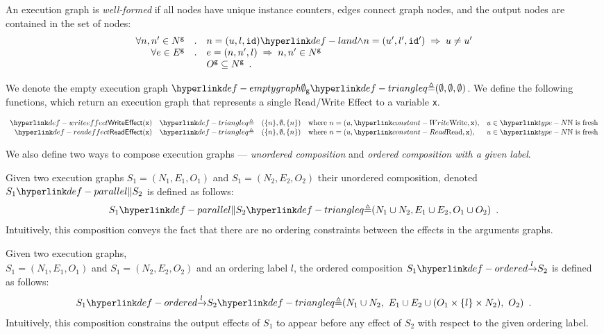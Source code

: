 An execution graph is \emph{well-formed} if all nodes have unique instance counters, edges connect graph nodes,
and the output nodes are contained in the set of nodes:
\[
  \begin{array}{rcl}
  \forall n, n' \in N^\xgraph &.& n=(u,l,\id) \land n=(u',l',\id') \;\Rightarrow\; u \neq u' \\
  \forall e \in E^\xgraph &.& e=(n, n', l) \;\Rightarrow\; n, n' \in N^\xgraph \\
  & & O^\xgraph \subseteq N^\xgraph \enspace.
  \end{array}
\]
\hypertarget{def-emptygraph}{}

We denote the empty execution graph $\emptygraph \triangleq (\emptyset, \emptyset, \emptyset)$.
%
We define the following functions, which return an execution graph that represents a single Read/Write Effect to a variable \texttt{x}.
\hypertarget{def-writeeffect}{}
\hypertarget{def-readeffect}{}
\begin{definition}
\[
  \begin{array}{rclll}
    \WriteEffect(\vx) &\triangleq& (\{n\}, \emptyset, \{n\}) & \text{where } n=(u, \Write, \vx), & u\in\N \text{ is fresh}\\
    \ReadEffect(\vx)  &\triangleq& (\{n\}, \emptyset, \{n\}) & \text{where } n=(u, \Read, \vx),   & u\in\N \text{ is fresh}\\
  \end{array}
\]
\end{definition}

We also define two ways to compose execution graphs --- \emph{unordered composition} and
\emph{ordered composition with a given label}.

\hypertarget{def-parallel}{}
\begin{definition}
Given two execution graphs $S_1 = (N_1, E_1, O_1)$ and $S_1 = (N_2, E_2, O_2)$ their unordered composition,
denoted $S_1 \parallelcomp S_2$ is defined as follows:
\[
  S_1 \parallelcomp S_2\triangleq (N_1 \cup N_2, E_1 \cup E_2, O_1 \cup O_2) \enspace.
\]
Intuitively, this composition conveys the fact that there are no ordering constraints between the effects
in the arguments graphs.
\end{definition}

\hypertarget{def-ordered}{}
\begin{definition}
Given two execution graphs, \\ $S_1 = (N_1, E_1, O_1)$ and $S_1 = (N_2, E_2, O_2)$ and an ordering label $l$,
the ordered composition $\ordered{S_1}{l}{S_2}$ is defined as follows:
\[
  \ordered{S_1}{l}{S_2} \triangleq (N_1 \cup N_2,\ E_1 \cup E_2 \cup (O_1 \times \{l\} \times N_2),\ O_2) \enspace.
\]
Intuitively, this composition constrains the output effects of $S_1$ to appear before any effect of $S_2$ with respect
to the given ordering label.
\end{definition}

